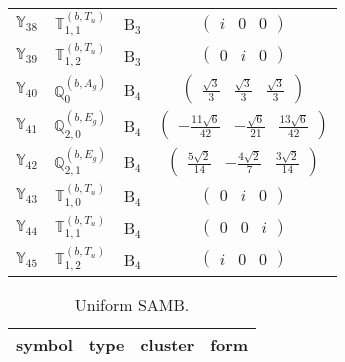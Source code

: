 \documentclass[fleqn,10pt,landscape]{article}
\begin{document}
\begin{itemize}
\begin{center}
\begin{longtable}{c|c|c|c}
$ \mathbb{Y}_{38} $ & $\mathbb{T}_{1,1}^{(b,T_{u})}$ & B$_{3}$ & $\begin{pmatrix} i & 0 & 0 \end{pmatrix}$ \\
$ \mathbb{Y}_{39} $ & $\mathbb{T}_{1,2}^{(b,T_{u})}$ & B$_{3}$ & $\begin{pmatrix} 0 & i & 0 \end{pmatrix}$ \\ \hline
$ \mathbb{Y}_{40} $ & $\mathbb{Q}_{0}^{(b,A_{g})}$ & B$_{4}$ & $\begin{pmatrix} \frac{\sqrt{3}}{3} & \frac{\sqrt{3}}{3} & \frac{\sqrt{3}}{3} \end{pmatrix}$ \\
$ \mathbb{Y}_{41} $ & $\mathbb{Q}_{2,0}^{(b,E_{g})}$ & B$_{4}$ & $\begin{pmatrix} - \frac{11 \sqrt{6}}{42} & - \frac{\sqrt{6}}{21} & \frac{13 \sqrt{6}}{42} \end{pmatrix}$ \\
$ \mathbb{Y}_{42} $ & $\mathbb{Q}_{2,1}^{(b,E_{g})}$ & B$_{4}$ & $\begin{pmatrix} \frac{5 \sqrt{2}}{14} & - \frac{4 \sqrt{2}}{7} & \frac{3 \sqrt{2}}{14} \end{pmatrix}$ \\
$ \mathbb{Y}_{43} $ & $\mathbb{T}_{1,0}^{(b,T_{u})}$ & B$_{4}$ & $\begin{pmatrix} 0 & i & 0 \end{pmatrix}$ \\
$ \mathbb{Y}_{44} $ & $\mathbb{T}_{1,1}^{(b,T_{u})}$ & B$_{4}$ & $\begin{pmatrix} 0 & 0 & i \end{pmatrix}$ \\
$ \mathbb{Y}_{45} $ & $\mathbb{T}_{1,2}^{(b,T_{u})}$ & B$_{4}$ & $\begin{pmatrix} i & 0 & 0 \end{pmatrix}$ \\
\end{longtable}
\end{center}
\begin{center}
\renewcommand{\arraystretch}{1.3}
\begin{longtable}{c|c|c|c}
\caption{Uniform SAMB.}
 \\
 \hline \hline
symbol & type & cluster & form \\ \hline \endfirsthead


\end{longtable}
\end{center}
\end{itemize}
\end{document}
